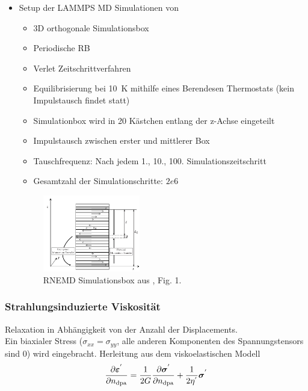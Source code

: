 \documentclass[a4paper, 10pt, 
               numbers=noenddot, toc=graduated,
               headsepline=true, footsepline=true,
               twoside=false, titlepage=true, 
               bibliography=totoc]{scrartcl}
\begin{document}
\begin{itemize}
		 \item Setup der LAMMPS MD Simulationen von \cite{Tenney2010} 
		 		\begin{itemize}
		 			\item 3D orthogonale Simulationsbox
		 			\item Periodische RB
		 			\item Verlet Zeitschrittverfahren
		 			\item Equilibrisierung bei \SI{10}{K} mithilfe eines Berendesen Thermostats (kein Impulstausch findet statt)
		 			\item Simulationbox wird in 20 Kästchen entlang der z-Achse eingeteilt
		 			\item Impulstausch zwischen erster und mittlerer Box
		 			\item Tauschfrequenz: Nach jedem 1., 10., 100. Simulationszeitschritt
		 			\item Gesamtzahl der Simulationschritte: $2e6$
		 		\end{itemize}
		 	
		 
		 
		\begin{figure}[H]
	    	\includegraphics[width=0.4\textwidth]{figs/rnemd_box}%
	    	\caption{RNEMD Simulationsbox aus \cite{Tenney2010}, Fig. 1.}
   		\end{figure}		 
		 
	\end{itemize}
	
	\subsubsection{Strahlungsinduzierte Viskosität}
	Relaxation in Abhängigkeit von der Anzahl der Displacements.\\
	Ein biaxialer Stress ($\sigma_{xx} = \sigma_{yy}$, alle anderen Komponenten des Spannungstensors sind 0) wird eingebracht. Herleitung aus dem viskoelastischen Modell\cite{hobler2017hpm}
	\begin{equation}\label{eqn:visco1}
	   \pdv{\bm{\varepsilon}^{'} }{n_\mathrm{dpa} } = \frac{1}{2G} \pdv{ \bm{\sigma}^{'} }{n_\mathrm{dpa}} + \frac{1}{2\eta^{'} }  \bm{\sigma}^{'} 
	\end{equation}
	
\end{document}
